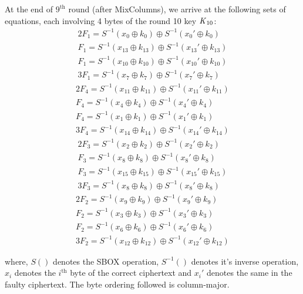 \documentclass[12pt,a4paper,english]{paper}
\begin{document}
At the end of $9^{\text{th}}$ round (after  {\selectfont MixColumns}), we arrive at the following sets of equations, each involving 4 bytes  of the round 10 key $\text{\textit{K}}_{10}$:
\begin{gather*}
    2F_1 = S^{-1}(x_{0} \oplus k_{0}) \oplus S^{−1}(x_{0}' \oplus k_{0})\\
    F_1 = S^{−1}(x_{13} \oplus k_{13}) \oplus S^{−1}(x_{13}' \oplus k_{13})\\
    F_1 = S^{−1}(x_{10} \oplus k_{10}) \oplus S^{−1}(x_{10}' \oplus k_{10})\\
    3F_1 = S^{−1}(x_{7} \oplus k_{7}) \oplus S^{−1}(x_{7}' \oplus k_{7})
\end{gather*}
\begin{gather*}
    2F_4 = S^{-1}(x_{11} \oplus k_{11}) \oplus S^{−1}(x_{11}' \oplus k_{11})\\
    F_4 = S^{−1}(x_{4} \oplus k_{4}) \oplus S^{−1}(x_{4}' \oplus k_{4})\\
    F_4 = S^{−1}(x_{1} \oplus k_{1}) \oplus S^{−1}(x_{1}' \oplus k_{1})\\
    3F_4 = S^{−1}(x_{14} \oplus k_{14}) \oplus S^{−1}(x_{14}' \oplus k_{14})
\end{gather*}
\begin{gather*}
    2F_3 = S^{-1}(x_2 \oplus k_2) \oplus S^{−1}(x_2' \oplus k_2)\\
    F_3 = S^{−1}(x_{8} \oplus k_{8}) \oplus S^{−1}(x_{8}' \oplus k_{8})\\
    F_3 = S^{−1}(x_{15} \oplus k_{15}) \oplus S^{−1}(x_{15}' \oplus k_{15})\\
    3F_3 = S^{−1}(x_{8} \oplus k_{8}) \oplus S^{−1}(x_{8}' \oplus k_{8})
\end{gather*}
\begin{gather*}
    2F_2 = S^{-1}(x_9 \oplus k_9) \oplus S^{−1}(x_9' \oplus k_9)\\
    F_2 = S^{−1}(x_{3} \oplus k_{3}) \oplus S^{−1}(x_{3}' \oplus k_{3})\\
    F_2 = S^{−1}(x_{6} \oplus k_{6}) \oplus S^{−1}(x_{6}' \oplus k_{6})\\
    3F_2 = S^{−1}(x_{12} \oplus k_{12}) \oplus S^{−1}(x_{12}' \oplus k_{12})
\end{gather*}

where, $S()$ denotes the SBOX operation, $S^{-1}()$ denotes it's inverse operation, $x_i$ denotes the $i^{\text{th}}$ byte of the correct ciphertext and $x_i'$ denotes the same in the faulty ciphertext. The byte ordering followed is column-major.\\
\end{document}
